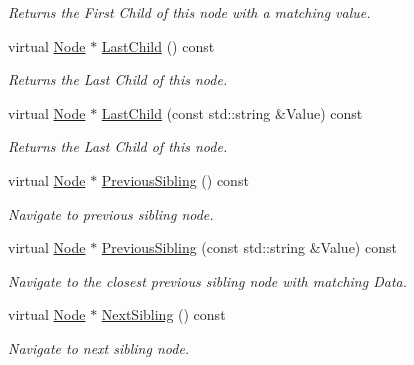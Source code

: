 \begin{DoxyCompactItemize}
\begin{DoxyCompactList}\small\item\em Returns the First Child of this node with a matching value. \item\end{DoxyCompactList}\item 
virtual \hyperlink{classphys_1_1xml_1_1Node}{Node} $\ast$ \hyperlink{classphys_1_1xml_1_1Node_ab4d29b30376c6a42dfa4fe329c86043b}{LastChild} () const 
\begin{DoxyCompactList}\small\item\em Returns the Last Child of this node. \item\end{DoxyCompactList}\item 
virtual \hyperlink{classphys_1_1xml_1_1Node}{Node} $\ast$ \hyperlink{classphys_1_1xml_1_1Node_a74cfe178f2422aaf8991bad4f73a65e6}{LastChild} (const std::string \&Value) const 
\begin{DoxyCompactList}\small\item\em Returns the Last Child of this node. \item\end{DoxyCompactList}\item 
virtual \hyperlink{classphys_1_1xml_1_1Node}{Node} $\ast$ \hyperlink{classphys_1_1xml_1_1Node_a73304432c30489b7a13602d4b7546bc1}{PreviousSibling} () const 
\begin{DoxyCompactList}\small\item\em Navigate to previous sibling node. \item\end{DoxyCompactList}\item 
virtual \hyperlink{classphys_1_1xml_1_1Node}{Node} $\ast$ \hyperlink{classphys_1_1xml_1_1Node_a78bf468453807361d9b387b9848144f7}{PreviousSibling} (const std::string \&Value) const 
\begin{DoxyCompactList}\small\item\em Navigate to the closest previous sibling node with matching Data. \item\end{DoxyCompactList}\item 
virtual \hyperlink{classphys_1_1xml_1_1Node}{Node} $\ast$ \hyperlink{classphys_1_1xml_1_1Node_aba3e37e0f027f7ebdcd4db9b0801b794}{NextSibling} () const 
\begin{DoxyCompactList}\small\item\em Navigate to next sibling node. \item\end{DoxyCompactList}\item 

\end{DoxyCompactItemize}

